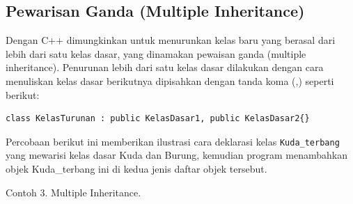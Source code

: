 \subsection{Pewarisan Ganda (Multiple
Inheritance)}\label{pewarisan-ganda-multiple-inheritance}

Dengan C++ dimungkinkan untuk menurunkan kelas baru yang berasal dari
lebih dari satu kelas dasar, yang dinamakan pewaisan ganda (multiple
inheritance). Penurunan lebih dari satu kelas dasar dilakukan dengan
cara menuliskan kelas dasar berikutnya dipisahkan dengan tanda koma (,)
seperti berikut:

\begin{verbatim}
class KelasTurunan : public KelasDasar1, public KelasDasar2{}
\end{verbatim}

Percobaan berikut ini memberikan ilustrasi cara deklarasi kelas
\texttt{Kuda\_terbang} yang mewarisi kelas dasar Kuda dan Burung,
kemudian program menambahkan objek Kuda\_terbang ini di kedua jenis
daftar objek tersebut.

Contoh 3. Multiple Inheritance.

